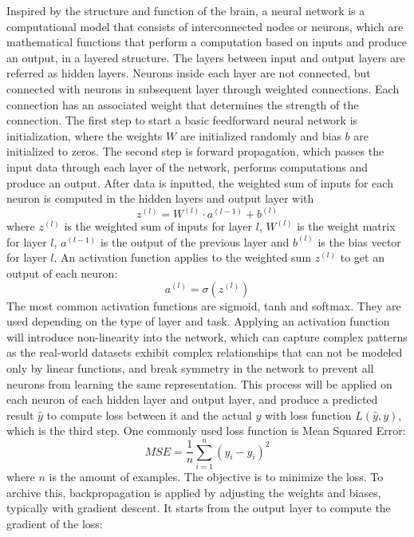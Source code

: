 \documentclass[12pt,a4paper,english
]{tunithesis}
\begin{document}
Inspired by the structure and function of the brain, a neural network is a computational model that consists of  interconnected nodes or neurons, which are mathematical functions that perform a computation based on inputs and produce an output, in a layered structure. The layers between input and output layers are referred as hidden layers. Neurons inside each layer are not connected, but connected with neurons in subsequent layer through weighted connections. Each connection has an associated weight that determines the strength of the connection. The first step to start a basic feedforward neural network is initialization, where the weights $W$ are initialized randomly and bias $b$ are initialized to zeros. The second step is forward propagation, which passes the input data through each layer of the network, performs computations and produce an output. After data is inputted, the weighted sum of inputs for each neuron is computed in the hidden layers and output layer with
\begin{equation*}
    z^{(l)}=W^{(l)} \cdot a^{(l-1)}+b^{(l)}
\end{equation*}
where $z^{(l)}$ is the weighted sum of inputs for layer $l$, $W^{(l)}$ is the weight matrix for layer $l$, $a^{(l-1)}$ is the output of the previous layer and $b^{(l)}$ is the bias vector for layer $l$. An activation function applies to the weighted sum $z^{(l)}$ to get an output of each neuron:
\begin{equation*}
    a^{(l)}=\sigma\left(z^{(l)}\right)
\end{equation*}
The most common activation functions are sigmoid, tanh and softmax. They are used depending on the type of layer and task. Applying an activation function will introduce non-linearity into the network, which can capture complex patterns as the real-world datasets exhibit complex relationships that can not be modeled only by linear functions, and break symmetry in the network to prevent all neurons from learning the same representation. This process will be applied on each neuron of each hidden layer and output layer, and produce a predicted result $\hat{y}$ to compute loss between it and the actual $y$ with loss function $L(\hat{y}, y)$, which is the third step. One commonly used loss function is Mean Squared Error:
\begin{equation*}
    M S E=\frac{1}{n} \sum_{i=1}^n\left(y_i-\hat{y}_i\right)^2
\end{equation*}
where $n$ is the amount of examples. The objective is to minimize the loss. To archive this, backpropagation is applied by adjusting the weights and biases, typically with gradient descent. It starts from the output layer to compute the gradient of the loss:
\end{document}
